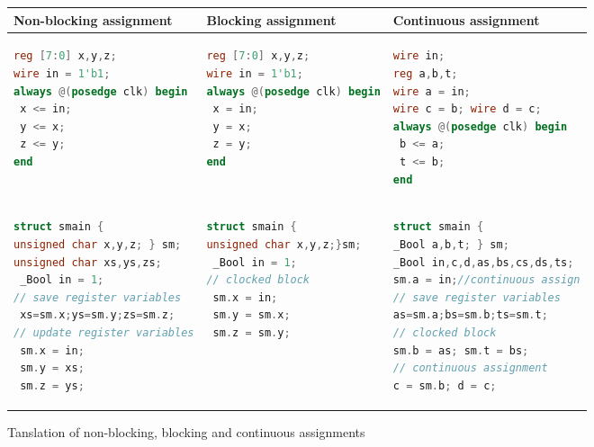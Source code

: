 \begin{figure*}
\scriptsize
\center
\begin{tabular}{l|l|l}
\hline
Non-blocking assignment & Blocking assignment & Continuous assignment \\
\hline
\begin{lstlisting}[mathescape=true,language=Verilog]
reg [7:0] x,y,z;
wire in = 1'b1;
always @(posedge clk) begin
 x <= in;
 y <= x;
 z <= y;
end
\end{lstlisting}
&
\begin{lstlisting}[mathescape=true,language=Verilog]
reg [7:0] x,y,z;
wire in = 1'b1;
always @(posedge clk) begin
 x = in;
 y = x;
 z = y;
end
\end{lstlisting}
&
\begin{lstlisting}[mathescape=true,language=Verilog]
wire in;
reg a,b,t;
wire a = in;
wire c = b; wire d = c; 
always @(posedge clk) begin
 b <= a;
 t <= b;
end 
\end{lstlisting}
\\
\hline 
\begin{lstlisting}[mathescape=true,language=C]
struct smain { 
unsigned char x,y,z; } sm;
unsigned char xs,ys,zs;
 _Bool in = 1;
// save register variables
 xs=sm.x;ys=sm.y;zs=sm.z;
// update register variables
 sm.x = in;
 sm.y = xs;
 sm.z = ys;
\end{lstlisting}
&
\begin{lstlisting}[mathescape=true,language=C]
struct smain {
unsigned char x,y,z;}sm;
 _Bool in = 1;
// clocked block
 sm.x = in;
 sm.y = sm.x;
 sm.z = sm.y;
\end{lstlisting}
&
\begin{lstlisting}[mathescape=true,language=C]
struct smain {
_Bool a,b,t; } sm;
_Bool in,c,d,as,bs,cs,ds,ts;
sm.a = in;//continuous assign
// save register variables
as=sm.a;bs=sm.b;ts=sm.t;
// clocked block
sm.b = as; sm.t = bs;
// continuous assignment 
c = sm.b; d = c;
\end{lstlisting}
\\
\hline
\end{tabular}
\caption{Tanslation of non-blocking, blocking and continuous assignments}
\label{figure:block}
\end{figure*}

